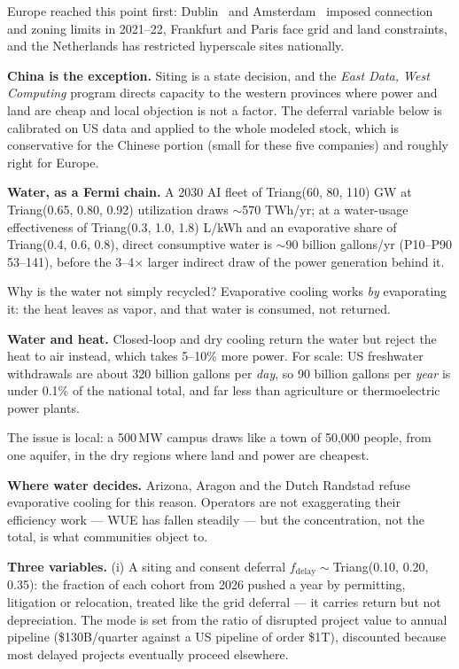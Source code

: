 \documentclass[11pt,letterpaper]{article}
\newcommand{\lead}[1]{{\color{leadwarm}\sffamily\bfseries #1}}
\begin{document}
Europe reached this point first: Dublin~\cite{ref:eirgrid_cru} and Amsterdam~\cite{ref:amsterdam} imposed connection and zoning limits in 2021--22, Frankfurt and Paris face grid and land constraints, and the Netherlands has restricted hyperscale sites nationally.

\lead{China is the exception.} Siting is a state decision, and the \emph{East Data, West Computing} program directs capacity to the western provinces where power and land are cheap and local objection is not a factor. The deferral variable below is calibrated on US data and applied to the whole modeled stock, which is conservative for the Chinese portion (small for these five companies) and roughly right for Europe.

\lead{Water, as a Fermi chain.} A 2030 AI fleet of Triang(60, 80, 110) GW at Triang(0.65, 0.80, 0.92) utilization draws $\sim$570 TWh/yr; at a water-usage effectiveness of Triang(0.3, 1.0, 1.8) L/kWh and an evaporative share of Triang(0.4, 0.6, 0.8), direct consumptive water is $\sim$90 billion gallons/yr (P10--P90 53--141), before the 3--4$\times$ larger indirect draw of the power generation behind it.

Why is the water not simply recycled? Evaporative cooling works \emph{by} evaporating it: the heat leaves as vapor, and that water is consumed, not returned.

\lead{Water and heat.} Closed-loop and dry cooling return the water but reject the heat to air instead, which takes 5--10\% more power. For scale: US freshwater withdrawals are about 320 billion gallons per \emph{day}, so 90 billion gallons per \emph{year} is under 0.1\% of the national total, and far less than agriculture or thermoelectric power plants.

The issue is local: a 500\,MW campus draws like a town of 50{,}000 people, from one aquifer, in the dry regions where land and power are cheapest.

\lead{Where water decides.} Arizona, Aragon and the Dutch Randstad refuse evaporative cooling for this reason. Operators are not exaggerating their efficiency work --- WUE has fallen steadily --- but the concentration, not the total, is what communities object to.

\lead{Three variables.} (i) A siting and consent deferral $f_{\text{delay}}\sim$Triang(0.10, 0.20, 0.35): the fraction of each cohort from 2026 pushed a year by permitting, litigation or relocation, treated like the grid deferral --- it carries return but not depreciation. The mode is set from the ratio of disrupted project value to annual pipeline (\$130B/quarter against a US pipeline of order \$1T), discounted because most delayed projects eventually proceed elsewhere.
\end{document}
